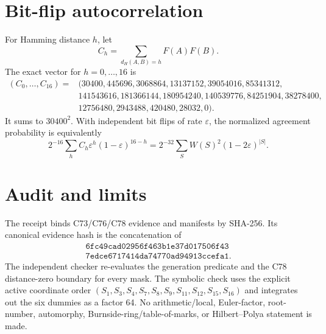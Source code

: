 \documentclass[10pt]{article}
\begin{document}
\section{Bit-flip autocorrelation}
For Hamming distance $h$, let
\[
 C_h=\sum_{d_H(A,B)=h}F(A)F(B).
\]
The exact vector for $h=0,\ldots,16$ is
\[
\begin{aligned}
(C_0,\ldots,C_{16})={}&(30400,445696,3068864,13137152,39054016,85341312,\\
&141543616,181366144,180954240,140539776,84251904,38278400,\\
&12756480,2943488,420480,28032,0).
\end{aligned}
\]
It sums to $30400^2$.  With independent bit flips of rate $\varepsilon$,
the normalized agreement probability is equivalently
\[
2^{-16}\sum_h C_h\varepsilon^h(1-\varepsilon)^{16-h}
 =2^{-32}\sum_S W(S)^2(1-2\varepsilon)^{|S|}.
\]

\section{Audit and limits}
The receipt binds C73/C76/C78 evidence and manifests by SHA-256.  Its canonical
evidence hash is the concatenation of
\[
\begin{gathered}
\texttt{6fc49cad02956f463b1e37d017506f43}\\[-2pt]
\texttt{7edce6717414da74770ad94913ccefa1}.
\end{gathered}
\]
The independent checker re-evaluates the generation predicate and the C78
distance-zero boundary for every mask.  The symbolic check uses the explicit
active coordinate order
$(S_1,S_3,S_4,S_7,S_8,S_9,S_{11},S_{12},S_{15},S_{16})$ and integrates out
the six dummies as a factor 64.  No arithmetic/local, Euler-factor,
root-number, automorphy, Burnside-ring/table-of-marks, or Hilbert--Polya
statement is made.
\end{document}
